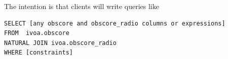 \documentclass[11pt,a4paper]{ivoa}
\begin{document}
The intention is that clients will write queries like
\begin{lstlisting}
SELECT [any obscore and obscore_radio columns or expressions]
FROM  ivoa.obscore
NATURAL JOIN ivoa.obscore_radio
WHERE [constraints]
\end{lstlisting}



%


        
\end{document}
